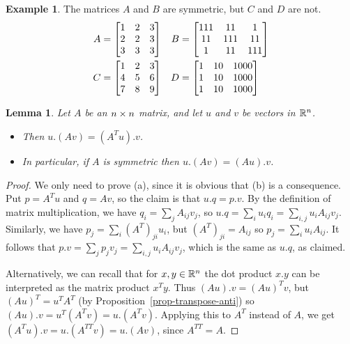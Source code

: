 \documentclass[reqno]{amsart}
\newtheorem{lemma}[theorem]{Lemma}
\theoremstyle{definition}
\newtheorem{example}[theorem]{Example}
\begin{document}
\begin{example}
 The matrices $A$ and $B$ are symmetric, but $C$ and $D$ are not.
 \begin{align*}
    A &
     = \left[\begin{matrix} 1 & 2 & 3 \\ 2 & 2 & 3 \\ 3 & 3 & 3 \end{matrix}\right] &
    B &
     = \left[\begin{matrix} 111 & 11 & 1 \\ 11 & 111 & 11 \\ 1 & 11 & 111 \end{matrix}\right]\\
    C &
     = \left[\begin{matrix} 1 & 2 & 3 \\ 4 & 5 & 6 \\ 7 & 8 & 9 \end{matrix}\right] &
    D &
     = \left[\begin{matrix} 1 & 10 & 1000 \\ 1 & 10 & 1000 \\ 1 & 10 & 1000 \end{matrix}\right]
 \end{align*}
\end{example}

\begin{lemma}\label{lem-transpose-adjoint}
 Let $A$ be an $n\times n$ matrix, and let $u$ and $v$ be vectors in
 ${\mathbb{R}}^n$.
 \begin{itemize}
 \item[(a)] Then $u.(Av)=(A^Tu).v$.
 \item[(b)] In particular, if $A$ is symmetric
 then $u.(Av)=(Au).v$.
 \end{itemize}
\end{lemma}
\begin{proof}
 We only need to prove (a), since it is obvious that (b) is a consequence.
 Put $p=A^Tu$ and $q=Av$, so the claim is that $u.q=p.v$.  By
 the definition of matrix multiplication, we have
 $q_i=\sum_jA_{ij}v_j$, so $u.q=\sum_iu_iq_i=\sum_{i,j}u_iA_{ij}v_j$.
 Similarly, we have $p_j=\sum_i(A^T)_{ji}u_i$, but $(A^T)_{ji}=A_{ij}$
 so $p_j=\sum_iu_iA_{ij}$.  It follows that
 $p.v=\sum_jp_jv_j=\sum_{i,j}u_iA_{ij}v_j$, which is the same as
 $u.q$, as claimed.

 Alternatively, we can recall that for $x,y\in{\mathbb{R}}^n$ the dot product
 $x.y$ can be interpreted as the matrix product $x^Ty$.  Thus
 $(Au).v=(Au)^Tv$, but $(Au)^T=u^TA^T$ (by
 Proposition~\ref{prop-transpose-anti}) so
 $(Au).v=u^T(A^Tv)=u.(A^Tv)$.
 Applying this to $A^T$ instead of $A$, we get
 $(A^T u).v = u.(A^{TT} v) = u.(Av)$, since $A^{TT} = A$.
\end{proof}
\end{document}
